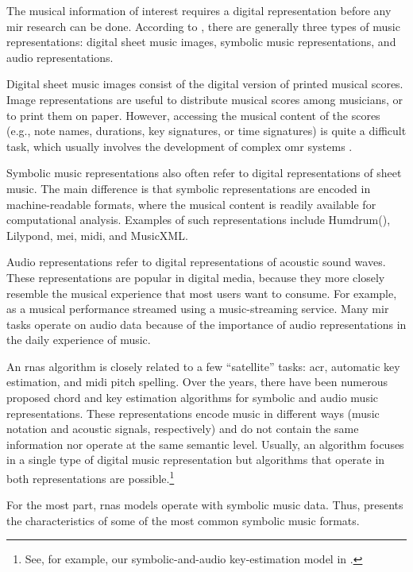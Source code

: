 


The musical information of interest requires a digital
representation before any \gls{mir} research can be done.
According to \textcite{muller2015music}, there are generally
three types of music representations: digital sheet music
images, symbolic music representations, and audio
representations.

Digital sheet music images consist of the digital version of
printed musical scores. Image representations are useful to
distribute musical scores among musicians, or to print them
on paper. However, accessing the musical content of the
scores (e.g., note names, durations, key signatures, or time
signatures) is quite a difficult task, which usually
involves the development of complex \gls{omr} systems
\parencite{calvozaragoza2020understanding}.

Symbolic music representations also often refer to digital
representations of sheet music. The main difference is that
symbolic representations are encoded in machine-readable
formats, where the musical content is readily available for
computational analysis. Examples of such representations
include Humdrum(), Lilypond, \gls{mei},
\gls{midi}, and MusicXML.

Audio representations refer to digital representations of
acoustic sound waves. These representations are popular in
digital media, because they more closely resemble the
musical experience that most users want to consume. For
example, as a musical performance streamed using a
music-streaming service. Many \gls{mir} tasks operate on
audio data because of the importance of audio
representations in the daily experience of music.

An \glspl{rna} algorithm is closely related to a few
``satellite'' tasks: \gls{acr}, automatic key estimation,
and \gls{midi} pitch spelling. Over the years, there have
been numerous proposed chord and key estimation algorithms
for symbolic and audio music representations. These
representations encode music in different ways (music
notation and acoustic signals, respectively) and do not
contain the same information nor operate at the same
semantic level. Usually, an algorithm focuses in a single
type of digital music representation but algorithms that
operate in both representations are possible.\footnote{See,
for example, our symbolic-and-audio key-estimation model in
\textcite{napoleslopez2019keyfinding}.}

For the most part, \glspl{rna} models operate with symbolic
music data. Thus,  presents
the characteristics of some of the most common symbolic
music formats. 

